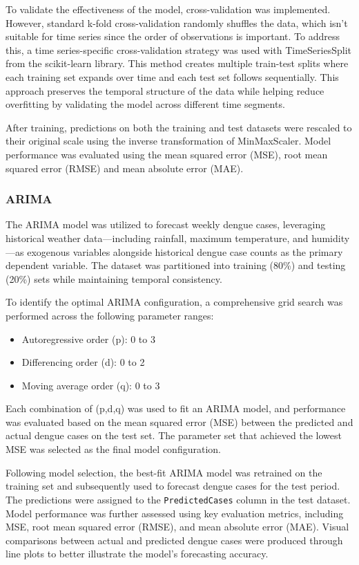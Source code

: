 To validate the effectiveness of the model, cross-validation was implemented. However, standard k-fold cross-validation randomly shuffles the data, which isn't suitable for time series since the order of observations is important. To address this, a time series-specific cross-validation strategy was used with TimeSeriesSplit from the scikit-learn library. This method creates multiple train-test splits where each training set expands over time and each test set follows sequentially. This approach preserves the temporal structure of the data while helping reduce overfitting by validating the model across different time segments.

After training, predictions on both the training and test datasets were rescaled to their original scale using the inverse transformation of MinMaxScaler. Model performance was evaluated using the mean squared error (MSE), root mean squared error (RMSE) and mean absolute error (MAE).

\subsubsection{ARIMA}
The ARIMA model was utilized to forecast weekly dengue cases, leveraging historical weather data—including rainfall, maximum temperature, and humidity—as exogenous variables alongside historical dengue case counts as the primary dependent variable. The dataset was partitioned into training (80\%) and testing (20\%) sets while maintaining temporal consistency.

To identify the optimal ARIMA configuration, a comprehensive grid search was performed across the following parameter ranges:
\begin{itemize} \item Autoregressive order (p): 0 to 3 \item Differencing order (d): 0 to 2 \item Moving average order (q): 0 to 3 \end{itemize}

Each combination of (p,d,q) was used to fit an ARIMA model, and performance was evaluated based on the mean squared error (MSE) between the predicted and actual dengue cases on the test set. The parameter set that achieved the lowest MSE was selected as the final model configuration.

Following model selection, the best-fit ARIMA model was retrained on the training set and subsequently used to forecast dengue cases for the test period. The predictions were assigned to the \texttt{PredictedCases} column in the test dataset. Model performance was further assessed using key evaluation metrics, including MSE, root mean squared error (RMSE), and mean absolute error (MAE). Visual comparisons between actual and predicted dengue cases were produced through line plots to better illustrate the model's forecasting accuracy.

